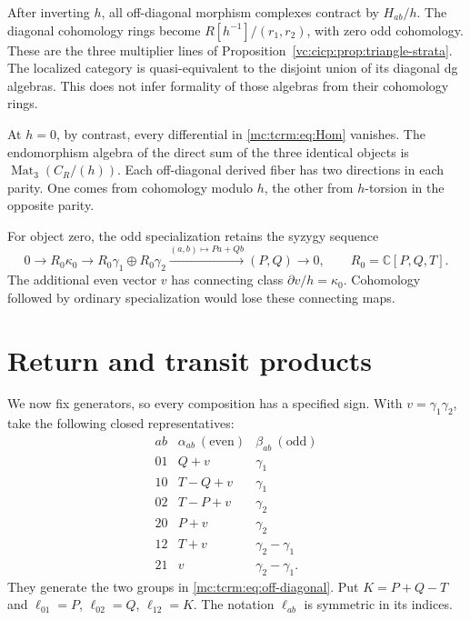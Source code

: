 After inverting $h$, all off-diagonal morphism
complexes contract by $H_{ab}/h$. The diagonal
cohomology rings become $R[h^{-1}]/(r_1,r_2)$,
with zero odd cohomology. These are the three
multiplier lines of Proposition~\ref{vc:cicp:prop:triangle-strata}.
The localized category is quasi-equivalent to the
disjoint union of its diagonal dg algebras. This
does not infer formality of those algebras from
their cohomology rings.

At $h=0$, by contrast, every differential in
\eqref{mc:tcrm:eq:Hom} vanishes. The endomorphism algebra
of the direct sum of the three identical objects is
$\operatorname{Mat}_3(C_R/(h))$.
Each off-diagonal derived fiber has two directions in each parity.
One comes from cohomology modulo $h$, the other from
$h$-torsion in the opposite parity.

For object zero, the odd
specialization retains the syzygy sequence
\[
 0\longrightarrow R_0\kappa_0
 \longrightarrow R_0\gamma_1\oplus R_0\gamma_2
 \xrightarrow{(a,b)\mapsto Pa+Qb}(P,Q)
 \longrightarrow0,\qquad R_0=\mathbb C[P,Q,T].
\]
The additional even vector $v$ has connecting class
$\partial v/h=\kappa_0$. Cohomology followed by ordinary
specialization would lose these connecting maps.

\section{Return and transit products}

We now fix generators, so every composition has a
specified sign. With $v=\gamma_1\gamma_2$, take
the following closed representatives:
\begin{equation}\label{mc:tcrm:eq:generators}
\begin{array}{c|c|c}
 ab&\alpha_{ab}\ (\text{even})&\beta_{ab}\ (\text{odd})\\ \hline
 01&Q+v&\gamma_1\\
 10&T-Q+v&\gamma_1\\
 02&T-P+v&\gamma_2\\
 20&P+v&\gamma_2\\
 12&T+v&\gamma_2-\gamma_1\\
 21&v&\gamma_2-\gamma_1.
\end{array}
\end{equation}
They generate the two groups in
\eqref{mc:tcrm:eq:off-diagonal}. Put $K=P+Q-T$ and
$\ell_{01}=P$, $\ell_{02}=Q$, $\ell_{12}=K$.
The notation $\ell_{ab}$ is symmetric in its indices.


